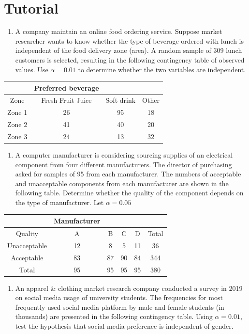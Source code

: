 \documentclass[]{book}
\providecommand{\tightlist}{%
  \setlength{\itemsep}{0pt}\setlength{\parskip}{0pt}}
\begin{document}
\newpage

\hypertarget{tutorial-3}{%
\section*{Tutorial}\label{tutorial-3}}


\begin{enumerate}
\def\labelenumi{\arabic{enumi}.}
\tightlist
\item
  A company maintain an online food ordering service. Suppose market researcher wants to know whether the type of beverage ordered with lunch is independent of the food delivery zone (area). A random sample of 309 lunch customers is selected, resulting in the following contingency table of observed values. Use \(\alpha = 0.01\) to determine whether the two variables are independent.
\end{enumerate}

\begin{longtable}[]{@{}cccc@{}}
\toprule
& Preferred beverage & &\tabularnewline
\midrule
\endhead
Zone & Fresh Fruit Juice & Soft drink & Other\tabularnewline
Zone 1 & 26 & 95 & 18\tabularnewline
Zone 2 & 41 & 40 & 20\tabularnewline
Zone 3 & 24 & 13 & 32\tabularnewline
\bottomrule
\end{longtable}

\begin{enumerate}
\def\labelenumi{\arabic{enumi}.}
\setcounter{enumi}{1}
\tightlist
\item
  A computer manufacturer is considering sourcing supplies of an electrical component from four different manufacturers. The director of purchasing asked for samples of 95 from each manufacturer. The numbers of acceptable and unacceptable components from each manufacturer are shown in the following table. Determine whether the quality of the component depends on the type of manufacturer. Let \(\alpha =0.05\)
\end{enumerate}

\begin{longtable}[]{@{}cccccc@{}}
\toprule
& Manufacturer & & & &\tabularnewline
\midrule
\endhead
Quality & A & B & C & D & Total\tabularnewline
Unacceptable & 12 & 8 & 5 & 11 & 36\tabularnewline
Acceptable & 83 & 87 & 90 & 84 & 344\tabularnewline
Total & 95 & 95 & 95 & 95 & 380\tabularnewline
\bottomrule
\end{longtable}

\begin{enumerate}
\def\labelenumi{\arabic{enumi}.}
\setcounter{enumi}{2}
\tightlist
\item
  An apparel \& clothing market research company conducted a survey in 2019 on social media usage of university students. The frequencies for most frequently used social media platform by male and female students (in thousands) are presented in the following contingency table. Using \(\alpha =0.01\), test the hypothesis that social media preference is independent of gender.
\end{enumerate}
\end{document}
